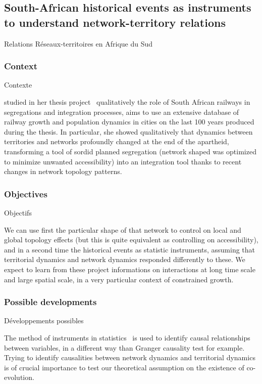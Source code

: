 \subsection[South-African historical events as instruments]{South-African historical events as instruments to understand network-territory relations}{Relations Réseaux-territoires en Afrique du Sud}

\subsubsection{Context}{Contexte}


 studied in her thesis project~\cite{baffi:tel-01389347} qualitatively the role of South African railways in segregations and integration processes, aims to use an extensive database of railway growth and population dynamics in cities on the last 100 years produced during the thesis. In particular, she showed qualitatively that dynamics between territories and networks profoundly changed at the end of the apartheid, transforming a tool of sordid  planned segregation (network shaped was optimized to minimize unwanted accessibility) into an integration tool thanks to recent changes in network topology patterns.

\subsubsection{Objectives}{Objectifs}

We can use first the particular shape of that network to control on local and global topology effects (but this is quite equivalent as controlling on accessibility), and in a second time the historical events as statistic instruments, assuming that territorial dynamics and network dynamics responded differently to these. We expect to learn from these project informations on interactions at long time scale and large spatial scale, in a very particular context of constrained growth. 






\subsubsection{Possible developments}{Développements possibles}


The method of instruments in statistics~\cite{angrist1996identification} is used to identify causal relationships between variables, in a different way than Granger causality test for example. Trying to identify causalities between network dynamics and territorial dynamics is of crucial importance to test our theoretical assumption on the existence of co-evolution.

















